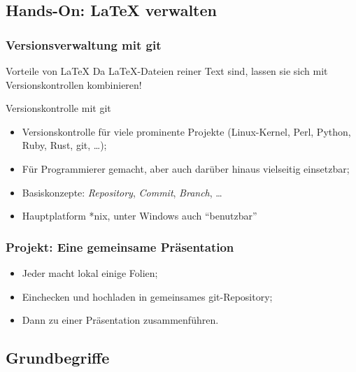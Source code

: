 \documentclass{cms-kurs}
\begin{document}
\subsection{Hands-On: \LaTeX{} verwalten}

\begin{frame}
  \frametitle{Versionsverwaltung mit git}

  \onslide<+->

  \begin{block}{Vorteile von \LaTeX{}}
    Da \LaTeX{}-Dateien reiner Text sind, lassen sie sich mit Versionskontrollen
    kombinieren!
  \end{block}

  \onslide<+->

  \begin{block}{Versionskontrolle mit git}
    \begin{itemize}
    \item Versionskontrolle für viele prominente Projekte (Linux-Kernel, Perl,
      Python, Ruby, Rust, git, \ldots);
    \item Für Programmierer gemacht, aber auch darüber hinaus vielseitig
      einsetzbar;
    \item Basiskonzepte: \emph{Repository}, \emph{Commit}, \emph{Branch}, \ldots
    \item Hauptplatform *nix, unter Windows auch \enquote{benutzbar}
    \end{itemize}
  \end{block}

\end{frame}

\begin{frame}
  \frametitle{Projekt: Eine gemeinsame Präsentation}

  \begin{itemize}
  \item Jeder macht lokal einige Folien;
  \item Einchecken und hochladen in gemeinsames git-Repository;
  \item Dann zu einer Präsentation zusammenführen.
  \end{itemize}

\end{frame}

\subsection{Grundbegriffe}
\end{document}
